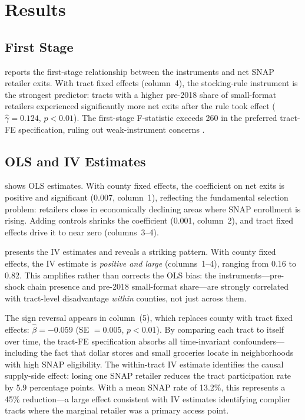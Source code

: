 \documentclass[12pt]{article}
\begin{document}
\section{Results}
\label{sec:results}

\subsection{First Stage}



 reports the first-stage relationship between the instruments and net SNAP retailer exits. With tract fixed effects (column~4), the stocking-rule instrument is the strongest predictor: tracts with a higher pre-2018 share of small-format retailers experienced significantly more net exits after the rule took effect ($\hat{\gamma} = 0.124$, $p < 0.01$). The first-stage F-statistic exceeds 260 in the preferred tract-FE specification, ruling out weak-instrument concerns \citep{staiger1997, stock2005}.

\subsection{OLS and IV Estimates}





 shows OLS estimates. With county fixed effects, the coefficient on net exits is positive and significant (0.007, column~1), reflecting the fundamental selection problem: retailers close in economically declining areas where SNAP enrollment is rising. Adding controls shrinks the coefficient (0.001, column~2), and tract fixed effects drive it to near zero (columns~3--4).

 presents the IV estimates and reveals a striking pattern. With county fixed effects, the IV estimate is \textit{positive and large} (columns~1--4), ranging from 0.16 to 0.82. This amplifies rather than corrects the OLS bias: the instruments---pre-shock chain presence and pre-2018 small-format share---are strongly correlated with tract-level disadvantage \textit{within} counties, not just across them.

The sign reversal appears in column~(5), which replaces county with tract fixed effects: $\hat{\beta} = -0.059$ (SE $= 0.005$, $p < 0.01$). By comparing each tract to itself over time, the tract-FE specification absorbs all time-invariant confounders---including the fact that dollar stores and small groceries locate in neighborhoods with high SNAP eligibility. The within-tract IV estimate identifies the causal supply-side effect: losing one SNAP retailer reduces the tract participation rate by 5.9 percentage points. With a mean SNAP rate of 13.2\%, this represents a 45\% reduction---a large effect consistent with IV estimates identifying complier tracts where the marginal retailer was a primary access point.
\end{document}
